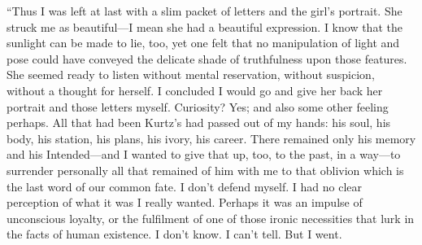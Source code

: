 \documentclass[12pt]{report}
\begin{document}
``Thus I was left at last with a slim packet of letters and the girl's
portrait. She struck me as beautiful---I mean she had a beautiful
expression. I know that the sunlight can be made to lie, too, yet one
felt that no manipulation of light and pose could have conveyed the
delicate shade of truthfulness upon those features. She seemed ready to
listen without mental reservation, without suspicion, without a thought
for herself. I concluded I would go and give her back her portrait and
those letters myself. Curiosity? Yes; and also some other feeling
perhaps. All that had been Kurtz's had passed out of my hands: his soul,
his body, his station, his plans, his ivory, his career. There remained
only his memory and his Intended---and I wanted to give that up, too, to
the past, in a way---to surrender personally all that remained of him
with me to that oblivion which is the last word of our common fate. I
don't defend myself. I had no clear perception of what it was I really
wanted. Perhaps it was an impulse of unconscious loyalty, or the
fulfilment of one of those ironic necessities that lurk in the facts of
human existence. I don't know. I can't tell. But I went.
\end{document}
